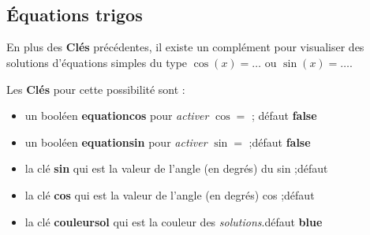 \documentclass{article}
\newcommand\Cle[1]{{\bfseries\sffamily\textlangle #1\textrangle}}
\begin{document}
\medskip

\begin{codesortie}
\begin{center}
	\begin{tikzpicture}[line join=bevel]
		\cercletrigoPL[rayon=2.5,affvaleurs=false,decal=8pt]
	\end{tikzpicture}
	~~~~
	\begin{tikzpicture}[line join=bevel]
		\cercletrigoPL[rayon=2.5,affangles=false]
	\end{tikzpicture}
	~~~~
	\begin{tikzpicture}[line join=bevel]
		\cercletrigoPL[rayon=2.5,moinspi=false,couleurfond=orange!15,taillevaleurs=\tiny]
	\end{tikzpicture}
\end{center}
\end{codesortie}

\subsection{Équations trigos}

\begin{codeinfo}
En plus des \Cle{Clés} précédentes, il existe un complément pour visualiser des solutions d'équations simples du type $\cos(x)=\ldots$ ou $\sin(x)=\ldots$.
\end{codeinfo}

\begin{codecles}
Les \Cle{Clés} pour cette possibilité sont :

\begin{itemize}
	\item un booléen \Cle{equationcos} pour \textit{activer} \og $\cos=$ \fg; \hfill{}défaut \Cle{false}
	\item un booléen \Cle{equationsin} pour \textit{activer} \og $\sin=$ \fg;\hfill{}défaut \Cle{false}
	\item la clé \Cle{sin} qui est la valeur de l'angle (en degrés) du sin ;\hfill{}défaut \Cle{30}
	\item la clé \Cle{cos} qui est la valeur de l'angle (en degrés) cos ;\hfill{}défaut \Cle{45}
	\item la clé \Cle{couleursol} qui est la couleur des \textit{solutions}.\hfill{}défaut \Cle{blue}
\end{itemize}
\end{codecles}
\end{document}
